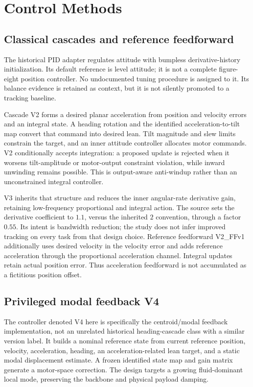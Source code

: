 \section{Control Methods}
\subsection{Classical cascades and reference feedforward}
The historical PID adapter regulates attitude with bumpless derivative-history initialization. Its default reference is level attitude; it is not a complete figure-eight position controller. No undocumented tuning procedure is assigned to it. Its balance evidence is retained as context, but it is not silently promoted to a tracking baseline.

Cascade V2 forms a desired planar acceleration from position and velocity errors and an integral state. A heading rotation and the identified acceleration-to-tilt map convert that command into desired lean. Tilt magnitude and slew limits constrain the target, and an inner attitude controller allocates motor commands. V2 conditionally accepts integration: a proposed update is rejected when it worsens tilt-amplitude or motor-output constraint violation, while inward unwinding remains possible. This is output-aware anti-windup rather than an unconstrained integral controller.

V3 inherits that structure and reduces the inner angular-rate derivative gain, retaining low-frequency proportional and integral action. The source sets the derivative coefficient to $1.1$, versus the inherited $2$ convention, through a factor $0.55$. Its intent is bandwidth reduction; the study does not infer improved tracking on every task from that design choice. Reference feedforward V2\_FFv1 additionally uses desired velocity in the velocity error and adds reference acceleration through the proportional acceleration channel. Integral updates retain actual position error. Thus acceleration feedforward is not accumulated as a fictitious position offset.

\subsection{Privileged modal feedback V4}
The controller denoted V4 here is specifically the centroid/modal feedback implementation, not an unrelated historical heading-cascade class with a similar version label. It builds a nominal reference state from current reference position, velocity, acceleration, heading, an acceleration-related lean target, and a static modal displacement estimate. A frozen identified state map and gain matrix generate a motor-space correction. The design targets a growing fluid-dominant local mode, preserving the backbone and physical payload damping.

